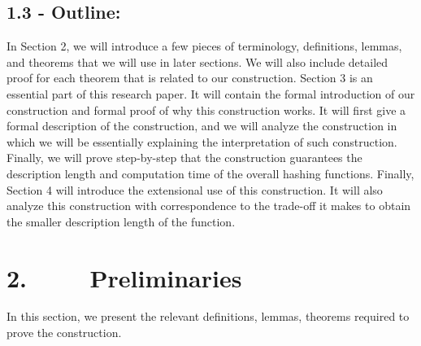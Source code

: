 \documentclass[a4paper, english]{paper}
\begin{document}
	\subsection{1.3 - Outline:} 
	In Section 2, we will introduce a few pieces of terminology, definitions, lemmas, and theorems that we will use in later sections. We will also include detailed proof for each theorem that is related to our construction. Section 3 is an essential part of this research paper. It will contain the formal introduction of our construction and formal proof of why this construction works. It will first give a formal description of the construction, and we will analyze the construction in which we will be essentially explaining the interpretation of such construction. Finally, we will prove step-by-step that the construction guarantees the description length and computation time of the overall hashing functions. Finally, Section 4 will introduce the extensional use of this construction. It will also analyze this construction with correspondence to the trade-off it makes to obtain the smaller description length of the function. \\
	
	\section{2. $\qquad$ Preliminaries}
	In this section, we present the relevant definitions, lemmas, theorems required to prove the construction.  \\
	
\end{document}
